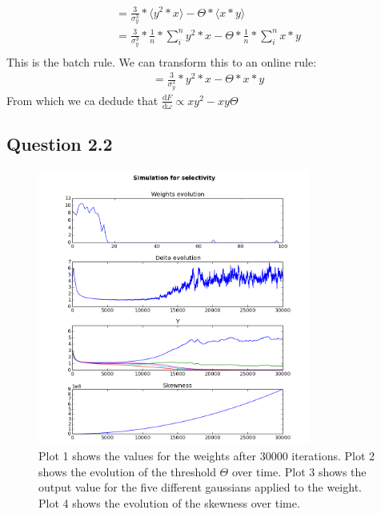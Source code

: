 \begin{align*}
	= \frac{3}{\sigma_y^3} * \langle y^2 * x \rangle - \Theta * \langle x * y \rangle \\
	= \frac{3}{\sigma_y^3} * \frac{1}{n} * \sum_{i}^{n} y^2*x - \Theta * \frac{1}{n} * \sum_{i}^{n} x * y \\
\end{align*}
This is the batch rule. We can transform this to an online rule:
\begin{align*}
	= \frac{3}{\sigma_y^3} * y^2*x - \Theta * x * y
\end{align*}
From which we ca dedude that $\frac{\mathrm{d}F}{\mathrm{d}\omega} \propto x y^2 - x y\Theta$

\subsection{Question 2.2}

\begin{figure}[H]
 \centering
 \includegraphics[width = 0.8\textwidth]{../results/exercise22}
 \caption{Plot 1 shows the values for the weights after 30000 iterations. Plot 2 shows the evolution of the threshold $\Theta$ over time. Plot 3 shows the output value for the five different gaussians applied to the weight. Plot 4 shows the evolution of the skewness over time.}
 \label{fig:fig2}
\end{figure}

